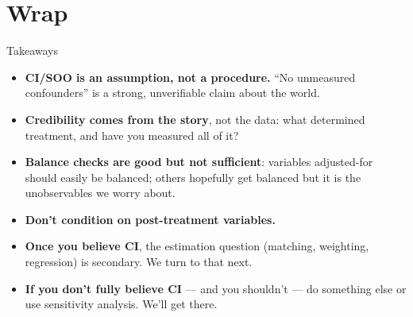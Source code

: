 \documentclass[xcolor=dvipsnames]{beamer}
\begin{document}
\section{Wrap}

\begin{frame}{Takeaways}
\small
\begin{itemize}
\item<1-> \textbf{CI/SOO is an assumption, not a procedure.}  ``No unmeasured confounders'' is a strong, unverifiable claim about the world.
\medskip
\item<2-> \textbf{Credibility comes from the story}, not the data: what determined treatment, and have you measured all of it?
\medskip
\item<3-> \textbf{Balance checks are good but not sufficient}:  variables adjusted-for should easily be balanced; others hopefully get balanced but it is the unobservables we worry about. 
\medskip
\item<4-> \textbf{Don't condition on post-treatment variables.}
\medskip
\item<5-> \textbf{Once you believe CI}, the estimation question (matching, weighting, regression) is secondary.  We turn to that next.
\medskip
\item<6-> \textbf{If you don't fully believe CI} --- and you shouldn't --- do something else or use sensitivity analysis. We'll get there.
\end{itemize}
\end{frame}
\end{document}
